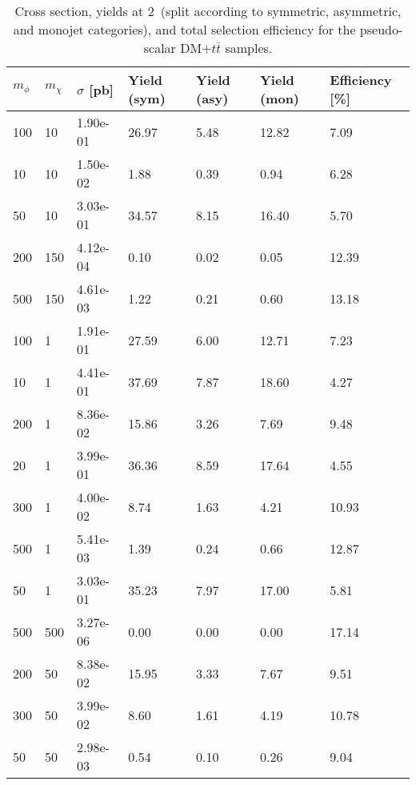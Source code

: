 \begin{table}
\renewcommand{\arraystretch}{1.0}
\small
\centering
\begin{tabular}{lllllll}
\hline
$m_\phi$ & $m_\chi$ & $\sigma$ [pb] & Yield (sym) & Yield (asy) & Yield (mon) & Efficiency [\%] \\ \hline
100       &   10        &   1.90e-01  &   26.97     &   5.48      &   12.82     &   7.09      \\ 
10        &   10        &   1.50e-02  &   1.88      &   0.39      &   0.94      &   6.28      \\ 
50        &   10        &   3.03e-01  &   34.57     &   8.15      &   16.40     &   5.70      \\ 
200       &   150       &   4.12e-04  &   0.10      &   0.02      &   0.05      &   12.39     \\ 
500       &   150       &   4.61e-03  &   1.22      &   0.21      &   0.60      &   13.18     \\ 
100       &   1         &   1.91e-01  &   27.59     &   6.00      &   12.71     &   7.23      \\ 
10        &   1         &   4.41e-01  &   37.69     &   7.87      &   18.60     &   4.27      \\ 
200       &   1         &   8.36e-02  &   15.86     &   3.26      &   7.69      &   9.48      \\ 
20        &   1         &   3.99e-01  &   36.36     &   8.59      &   17.64     &   4.55      \\ 
300       &   1         &   4.00e-02  &   8.74      &   1.63      &   4.21      &   10.93     \\ 
500       &   1         &   5.41e-03  &   1.39      &   0.24      &   0.66      &   12.87     \\ 
50        &   1         &   3.03e-01  &   35.23     &   7.97      &   17.00     &   5.81      \\ 
500       &   500       &   3.27e-06  &   0.00      &   0.00      &   0.00      &   17.14     \\ 
200       &   50        &   8.38e-02  &   15.95     &   3.33      &   7.67      &   9.51      \\ 
300       &   50        &   3.99e-02  &   8.60      &   1.61      &   4.19      &   10.78     \\ 
50        &   50        &   2.98e-03  &   0.54      &   0.10      &   0.26      &   9.04      \\ 
\hline
\end{tabular}
\caption{Cross section, yields at 2~\ifb (split according to symmetric, asymmetric, and monojet categories), and total selection efficiency for the pseudo-scalar DM$+t\bar{t}$ samples.}
\label{tab:dm_DMttP_2fb}
\end{table}

